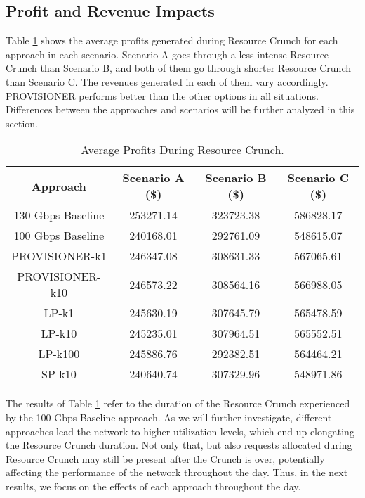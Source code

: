 \documentclass[journal]{IEEEtran}
\begin{document}
\subsection{Profit and Revenue Impacts}

Table \ref{tab:rev_rc} shows the average profits generated during Resource Crunch for each approach in each scenario. Scenario A goes through a less intense Resource Crunch than Scenario B, and both of them go through shorter Resource Crunch than Scenario C. The revenues generated in each of them vary accordingly. PROVISIONER performs better than the other options in all situations. Differences between the approaches and scenarios will be further analyzed in this section.

\begin{table}[!h]%
\caption{Average Profits During Resource Crunch.}\label{tab:rev_rc}
\centering
\tabcolsep=0.11cm
 \begin{tabular}{|c|c|c|c|}%
  \hline
	Approach		& Scenario A (\$) & Scenario B (\$) & Scenario C (\$) \\ \hline
 130 Gbps Baseline	&253271.14 	& 323723.38 	& 586828.17	\\ \hline
	100 Gbps Baseline	&240168.01 	& 292761.09 	& 548615.07	\\ \hline
	PROVISIONER-k1		&246347.08 	& 308631.33 	& 567065.61	\\ \hline
	PROVISIONER-k10		&246573.22 	& 308564.16 	& 566988.05	\\ \hline
 LP-k1				&245630.19 	& 307645.79 	& 565478.59	\\ \hline
 LP-k10				&245235.01 	& 307964.51 	& 565552.51	\\ \hline
 LP-k100				&245886.76 	& 292382.51		& 564464.21	\\ \hline
 SP-k10				&240640.74 	& 307329.96		& 548971.86	\\ \hline
  \hline
 \end{tabular}
 
\end{table}

The results of Table \ref{tab:rev_rc} refer to the duration of the Resource Crunch experienced by the 100 Gbps Baseline approach. As we will further investigate, different approaches lead the network to higher utilization levels, which end up elongating the Resource Crunch duration. Not only that, but also requests allocated during Resource Crunch may still be present after the Crunch is over, potentially affecting the performance of the network throughout the day. Thus, in the next results, we focus on the effects of each approach throughout the day.
\end{document}
